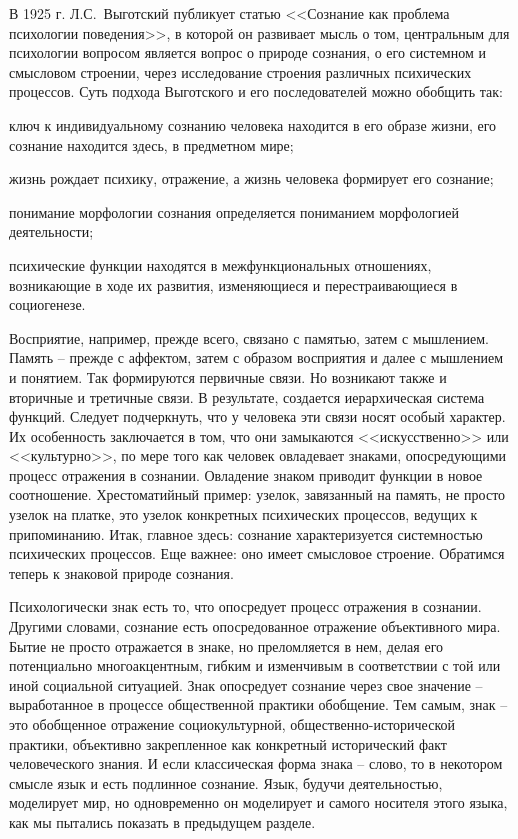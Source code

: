 В 1925 г. Л.С.~Выготский публикует статью <<Сознание как проблема
психологии поведения>>, в которой он развивает мысль о том, центральным
для психологии вопросом является вопрос о природе сознания, о его
системном и смысловом строении, через исследование строения различных
психических процессов. Суть подхода Выготского и его последователей
можно обобщить так:
\begin{enumerate*}[label=\asbuk*)]
\item ключ к индивидуальному сознанию человека
  находится в его образе жизни, его сознание находится здесь, в предметном
  мире;
\item жизнь рождает психику, отражение, а жизнь человека формирует
  его сознание;
\item понимание морфологии сознания определяется
  пониманием морфологией деятельности;
\item психические функции
  находятся в межфункциональных отношениях, возникающие в ходе их
  развития, изменяющиеся и перестраивающиеся в социогенезе.
\end{enumerate*}
Восприятие, например, прежде всего, связано с памятью, затем с мышлением. Память --
прежде с аффектом, затем с образом восприятия и далее с мышлением и
понятием. Так формируются первичные связи. Но возникают также и
вторичные и третичные связи. В результате, создается иерархическая
система функций. Следует подчеркнуть, что у человека эти связи носят
особый характер. Их особенность заключается в том, что они замыкаются
<<искусственно>> или <<культурно>>, по мере того как человек овладевает
знаками, опосредующими процесс отражения в сознании. Овладение знаком
приводит функции в новое соотношение. Хрестоматийный пример: узелок,
завязанный на память, не просто узелок на платке, это узелок конкретных
психических процессов, ведущих к припоминанию. Итак, главное здесь:
сознание характеризуется системностью психических процессов. Еще
важнее: оно имеет смысловое строение. Обратимся теперь к знаковой
природе сознания.

Психологически знак есть то, что опосредует процесс отражения в
сознании. Другими словами, сознание есть опосредованное отражение
объективного мира. Бытие не просто отражается в знаке, но преломляется в
нем, делая его потенциально многоакцентным, гибким и изменчивым в
соответствии с той или иной социальной ситуацией. Знак опосредует
сознание через свое значение -- выработанное в процессе общественной
практики обобщение. Тем самым, знак -- это обобщенное отражение
социокультурной, общественно-исторической практики, объективно
закрепленное как конкретный исторический факт человеческого знания. И
если классическая форма знака -- слово, то в некотором смысле язык и есть
подлинное сознание. Язык, будучи деятельностью, моделирует мир, но
одновременно он моделирует и самого носителя этого языка, как мы
пытались показать в предыдущем разделе.

